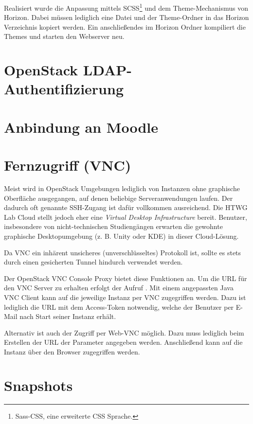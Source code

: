 Realisiert wurde die Anpassung mittels SCSS\footnote{Sass-CSS, eine erweiterte CSS Sprache.} und dem Theme-Mechanismus von Horizon.
Dabei müssen lediglich eine Datei und der  Theme-Ordner in das Horizon Verzeichnis kopiert werden.
Ein anschließendes  im Horizon Ordner kompiliert die Themes und starten den Webserver neu.

\section{OpenStack LDAP-Authentifizierung}

\section{Anbindung an Moodle}


\section{Fernzugriff (VNC)}

Meist wird in OpenStack Umgebungen lediglich von Instanzen ohne graphische Oberfläche ausgegangen, auf denen beliebige Serveranwendungen laufen. 
Der dadurch oft genannte SSH-Zugang ist dafür vollkommen ausreichend.
Die HTWG Lab Cloud stellt jedoch eher eine \emph{Virtual Desktop Infrastructure} bereit.
Benutzer, insbesondere von nicht-technischen Studiengängen erwarten die gewohnte graphische Desktopumgebung (z. B. Unity oder KDE) in dieser Cloud-Lösung.

Da VNC ein inhärent unsicheres (unverschlüsseltes) Protokoll ist, sollte es stets durch einen gesicherten Tunnel hindurch verwendet werden.

Der OpenStack VNC Console Proxy bietet diese Funktionen an.
Um die URL für den VNC Server zu erhalten erfolgt der Aufruf .
Mit einem angepassten Java VNC Client \cite{vncJava} kann auf die jeweilige Instanz per VNC zugegriffen werden. 
Dazu ist lediglich die URL mit dem Access-Token notwendig, welche der Benutzer per E-Mail nach Start seiner Instanz erhält.

Alternativ ist auch der Zugriff per Web-VNC möglich. 
Dazu muss lediglich beim Erstellen der URL der Parameter  angegeben werden. 
Anschließend kann auf die Instanz über den Browser zugegriffen werden.

\section{Snapshots}

